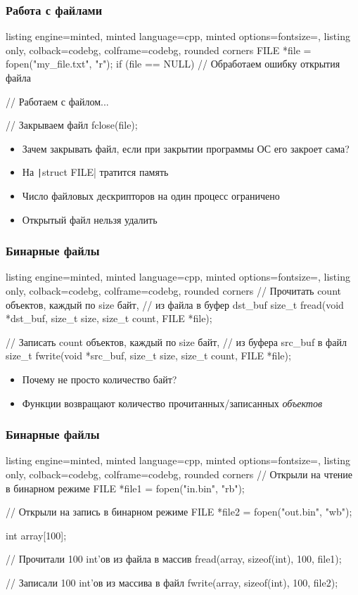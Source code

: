 \documentclass[10pt]{beamer}
\begin{document}
\begin{frame}[fragile]
\frametitle{Работа с файлами}
\begin{tcblisting}{listing engine=minted, minted language=cpp, minted options={fontsize=\scriptsize}, listing only, colback=codebg, colframe=codebg, rounded corners}
FILE *file = fopen("my_file.txt", "r");
if (file == NULL) {
  // Обработаем ошибку открытия файла
}

// Работаем с файлом...

// Закрываем файл
fclose(file);
\end{tcblisting}
\pause
{}
\begin{itemize}
\item Зачем закрывать файл, если при закрытии программы ОС его закроет сама?
\pause
\item На \texttt|struct FILE| тратится память
\pause
\item Число файловых дескрипторов на один процесс ограничено
\pause
\item Открытый файл нельзя удалить
\end{itemize}
\end{frame}

\begin{frame}[fragile]
\frametitle{Бинарные файлы}
\begin{tcblisting}{listing engine=minted, minted language=cpp, minted options={fontsize=\scriptsize}, listing only, colback=codebg, colframe=codebg, rounded corners}
// Прочитать count объектов, каждый по size байт,
// из файла в буфер dst_buf
size_t fread(void *dst_buf, size_t size, size_t count, FILE *file);

// Записать count объектов, каждый по size байт,
// из буфера src_buf в файл
size_t fwrite(void *src_buf, size_t size, size_t count, FILE *file);
\end{tcblisting}
\pause
{}
\begin{itemize}
\item Почему не просто количество байт?
\pause
\item Функции возвращают количество прочитанных/записанных \textit{объектов}
\end{itemize}
\end{frame}

\begin{frame}[fragile]
\frametitle{Бинарные файлы}
\begin{tcblisting}{listing engine=minted, minted language=cpp, minted options={fontsize=\scriptsize}, listing only, colback=codebg, colframe=codebg, rounded corners}
// Открыли на чтение в бинарном режиме
FILE *file1 = fopen("in.bin", "rb");

// Открыли на запись в бинарном режиме
FILE *file2 = fopen("out.bin", "wb");

int array[100];

// Прочитали 100 int'ов из файла в массив
fread(array, sizeof(int), 100, file1);

// Записали 100 int'ов из массива в файл
fwrite(array, sizeof(int), 100, file2);
\end{tcblisting}
\end{frame}
\end{document}
